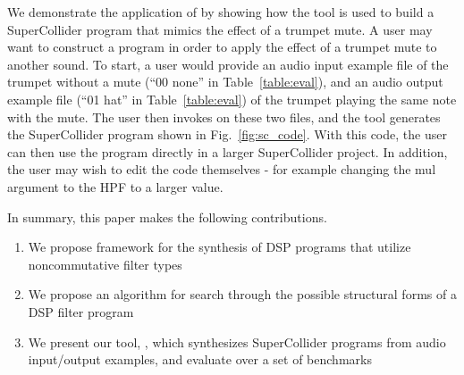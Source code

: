 We demonstrate the application of \ourTool by showing how the tool is used to build a SuperCollider program that mimics the effect of a trumpet mute.
A user may want to construct a program in order to apply the effect of a trumpet mute to another sound.
To start, a user would provide an audio input example file of the trumpet without a mute (``00 none'' in Table~\ref{table:eval}), and an audio output example file (``01 hat'' in Table~\ref{table:eval}) of the trumpet playing the same note with the mute.
The user then invokes \ourTool on these two files, and the tool generates the SuperCollider program shown in Fig.~\ref{fig:sc_code}.
With this code, the user can then use the program directly in a larger SuperCollider project.
In addition, the user may wish to edit the code themselves - for example changing the mul argument to the HPF to a larger value.

In summary, this paper makes the following contributions.

\begin{enumerate}
\item We propose framework for the synthesis of DSP programs that utilize noncommutative filter types 
\item We propose an algorithm for search through the possible structural forms of a DSP filter program
\item We present our tool, \ourTool, which synthesizes SuperCollider programs from audio input/output examples, and evaluate \ourTool over a set of benchmarks
\end{enumerate}


